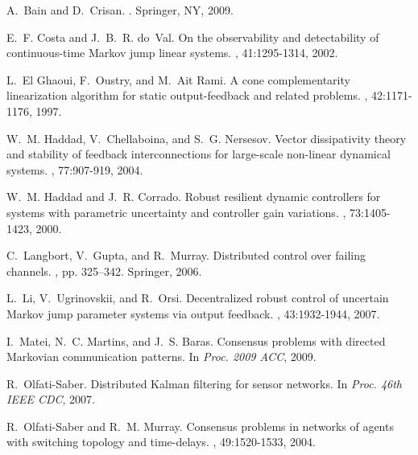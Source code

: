 \documentclass[a4paper,twocolumn]{autart}
\begin{document}
\newcommand{\noopsort}[1]{} \newcommand{\printfirst}[2]{#1}
  \newcommand{\singleletter}[1]{#1} \newcommand{\switchargs}[2]{#2#1}
\begin{thebibliography}{10}

A.~Bain and D.~Crisan.
.
\newblock Springer, NY, 2009.

E.~F. Costa and J.~B.~R. do~Val.
\newblock On the observability and detectability of continuous-time {M}arkov
  jump linear systems.
, 41:1295-1314, 2002.

L.~El Ghaoui, F.~Oustry, and M.~Ait Rami.
\newblock A cone complementarity linearization algorithm for static
  output-feedback and related problems.
, 42:1171-1176, 1997.

W.~M. Haddad, V.~Chellaboina, and S.~G. Nersesov.
\newblock Vector dissipativity theory and stability of feedback
  interconnections for large-scale non-linear dynamical systems.
, 77:907-919, 2004.

W.~M. Haddad and J.~R. Corrado.
\newblock Robust resilient dynamic controllers for systems with parametric
  uncertainty and controller gain variations.
, 73:1405-1423, 2000.

C.~Langbort, V.~Gupta, and R.~Murray.
\newblock Distributed control over failing channels.
, pp. 325--342. Springer,
  2006.

L.~Li, V.~Ugrinovskii, and R.~Orsi.
\newblock Decentralized robust control of uncertain {M}arkov jump parameter
  systems via output feedback.
, 43:1932-1944, 2007.

I.~Matei, N.~C. Martins, and J.~S. Baras.
\newblock Consensus problems with directed {M}arkovian communication patterns.
\newblock In {\em Proc. 2009 ACC}, 2009.

R.~Olfati-Saber.
\newblock Distributed {K}alman filtering for sensor networks.
\newblock In {\em Proc. 46th IEEE CDC}, 2007.

R.~Olfati-Saber and R.~M. Murray.
\newblock Consensus problems in networks of agents with switching topology and
  time-delays.
, 49:1520-1533, 2004.


\end{thebibliography}
\end{document}
